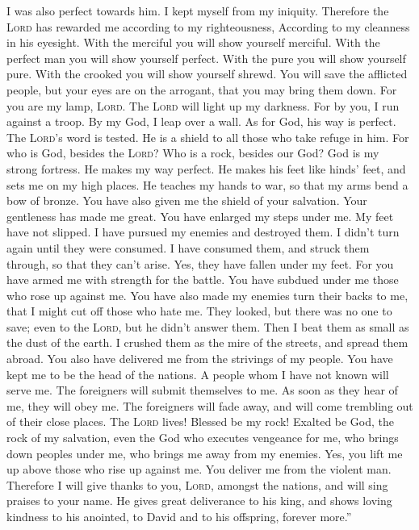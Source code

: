  I was also perfect towards him. I kept myself from my
iniquity.  Therefore the \textsc{Lord} has rewarded me
according to my righteousness, According to my cleanness in his
eyesight.  With the merciful you will show yourself
merciful. With the perfect man you will show yourself perfect.
 With the pure you will show yourself pure. With the
crooked you will show yourself shrewd.  You will save the
afflicted people, but your eyes are on the arrogant, that you may bring
them down.  For you are my lamp, \textsc{Lord}. The
\textsc{Lord} will light up my darkness.  For by you, I
run against a troop. By my God, I leap over a wall.  As
for God, his way is perfect. The \textsc{Lord}'s word is tested. He is a
shield to all those who take refuge in him.  For who is
God, besides the \textsc{Lord}? Who is a rock, besides our God?
 God is my strong fortress. He makes my way perfect.
 He makes his feet like hinds' feet, and sets me on my
high places.  He teaches my hands to war, so that my arms
bend a bow of bronze.  You have also given me the shield
of your salvation. Your gentleness has made me great. 
You have enlarged my steps under me. My feet have not slipped.
 I have pursued my enemies and destroyed them. I didn't
turn again until they were consumed.  I have consumed
them, and struck them through, so that they can't arise. Yes, they have
fallen under my feet.  For you have armed me with
strength for the battle. You have subdued under me those who rose up
against me.  You have also made my enemies turn their
backs to me, that I might cut off those who hate me. 
They looked, but there was no one to save; even to the \textsc{Lord},
but he didn't answer them.  Then I beat them as small as
the dust of the earth. I crushed them as the mire of the streets, and
spread them abroad.  You also have delivered me from the
strivings of my people. You have kept me to be the head of the nations.
A people whom I have not known will serve me.  The
foreigners will submit themselves to me. As soon as they hear of me,
they will obey me.  The foreigners will fade away, and
will come trembling out of their close places.  The
\textsc{Lord} lives! Blessed be my rock! Exalted be God, the rock of my
salvation,  even the God who executes vengeance for me,
who brings down peoples under me,  who brings me away
from my enemies. Yes, you lift me up above those who rise up against me.
You deliver me from the violent man.  Therefore I will
give thanks to you, \textsc{Lord}, amongst the nations, and will sing
praises to your name.  He gives great deliverance to his
king, and shows loving kindness to his anointed, to David and to his
offspring, forever more.''

